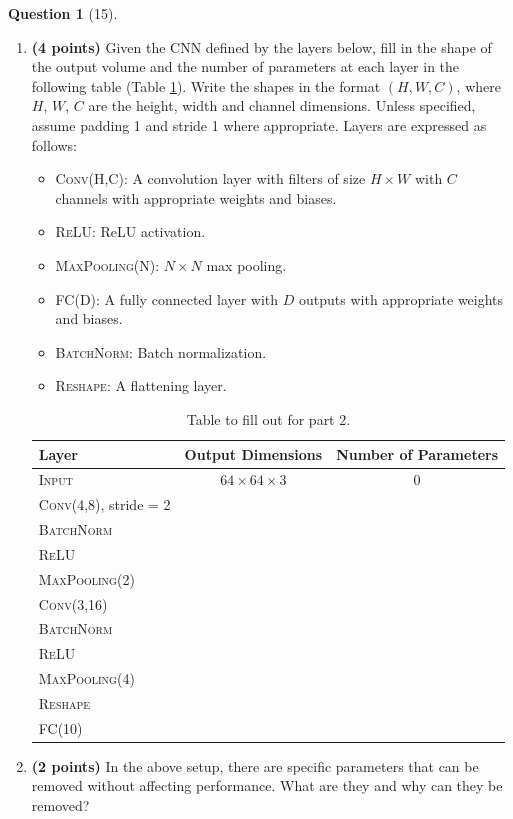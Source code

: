 \documentclass[12pt]{article}
\theoremstyle{definition}
\newtheorem{exercise}{Question}%
\begin{document}
\begin{exercise}[15]
{\begin{enumerate}
\item \textbf{(4 points)} Given the CNN defined by the layers below, fill in the shape of the output volume and the number of parameters at each layer in the following table (Table \ref{tab:cnn-table}). Write the shapes in the format $(H, W, C)$, where $H$, $W$, $C$ are the height, width and channel dimensions. Unless specified, assume padding 1 and stride 1 where appropriate. Layers are expressed as follows:
\begin{itemize}
    \item \textsc{Conv(H,C)}: A convolution layer with filters of size $H\times W$ with $C$ channels with appropriate weights and biases.
    \item \textsc{ReLU}: ReLU activation.
    \item \textsc{MaxPooling(N)}: $N\times N$ max pooling.
    \item \textsc{FC(D)}: A fully connected layer with $D$ outputs with appropriate weights and biases.
    \item \textsc{BatchNorm}: Batch normalization.
    \item \textsc{Reshape}: A flattening layer.
\end{itemize}
\begin{table}[h]
    \centering
    \begin{tabular}{l|c|c}
    \toprule
    Layer & Output Dimensions & Number of Parameters \\
    \midrule
    \textsc{Input} & $64\times 64 \times 3$ & $0$\\
    \textsc{Conv(4,8)}, stride = 2 & & \\
    \textsc{BatchNorm} & & \\
    \textsc{ReLU} & & \\
    \textsc{MaxPooling(2)} & & \\
    \textsc{Conv(3,16)} & & \\
    \textsc{BatchNorm} & & \\
    \textsc{ReLU} & & \\
    \textsc{MaxPooling(4)} & & \\
    \textsc{Reshape} & & \\
    \textsc{FC(10)} & & \\
    \bottomrule
    \end{tabular}
    \caption{Table to fill out for part 2.}
    \label{tab:cnn-table}
\end{table}

\item \textbf{(2 points)} In the above setup, there are specific parameters that can be removed without affecting performance. What are they and why can they be removed?


\end{enumerate}}
\end{exercise}
\end{document}
